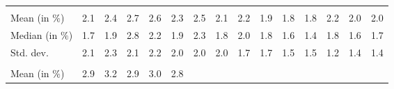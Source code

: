 \begin{tabular}{lllllllllllllll}
  \multicolumn{1}{r}{} &
  \multicolumn{1}{r}{} &
  \multicolumn{1}{r}{} &
  \multicolumn{1}{r}{} &
  \multicolumn{1}{r}{} &
  \multicolumn{1}{r}{} &
  \multicolumn{1}{r}{} &
  \multicolumn{1}{r}{} &
  \multicolumn{1}{r}{} &
  \multicolumn{1}{r}{} \\
\multicolumn{1}{l}{\hspace{2em}Mean (in $\%$)} &
  \multicolumn{1}{|r}{2.1} &
  \multicolumn{1}{r}{2.4} &
  \multicolumn{1}{r}{2.7} &
  \multicolumn{1}{r}{2.6} &
  \multicolumn{1}{r}{2.3} &
  \multicolumn{1}{r}{2.5} &
  \multicolumn{1}{r}{2.1} &
  \multicolumn{1}{r}{2.2} &
  \multicolumn{1}{r}{1.9} &
  \multicolumn{1}{r}{1.8} &
  \multicolumn{1}{r}{1.8} &
  \multicolumn{1}{r}{2.2} &
  \multicolumn{1}{r}{2.0} &
  \multicolumn{1}{r}{2.0} \\
\multicolumn{1}{l}{\hspace{2em}Median (in $\%$)} &
  \multicolumn{1}{|r}{1.7} &
  \multicolumn{1}{r}{1.9} &
  \multicolumn{1}{r}{2.8} &
  \multicolumn{1}{r}{2.2} &
  \multicolumn{1}{r}{1.9} &
  \multicolumn{1}{r}{2.3} &
  \multicolumn{1}{r}{1.8} &
  \multicolumn{1}{r}{2.0} &
  \multicolumn{1}{r}{1.8} &
  \multicolumn{1}{r}{1.6} &
  \multicolumn{1}{r}{1.4} &
  \multicolumn{1}{r}{1.8} &
  \multicolumn{1}{r}{1.6} &
  \multicolumn{1}{r}{1.7} \\
\multicolumn{1}{l}{\hspace{2em}Std. dev.} &
  \multicolumn{1}{|r}{2.1} &
  \multicolumn{1}{r}{2.3} &
  \multicolumn{1}{r}{2.1} &
  \multicolumn{1}{r}{2.2} &
  \multicolumn{1}{r}{2.0} &
  \multicolumn{1}{r}{2.0} &
  \multicolumn{1}{r}{2.0} &
  \multicolumn{1}{r}{1.7} &
  \multicolumn{1}{r}{1.7} &
  \multicolumn{1}{r}{1.5} &
  \multicolumn{1}{r}{1.5} &
  \multicolumn{1}{r}{1.2} &
  \multicolumn{1}{r}{1.4} &
  \multicolumn{1}{r}{1.4} \\
\multicolumn{1}{l}{\hspace{1em}{\textit{Additive term} ($\widehat{t}/\widetilde{p}$)}} &
  \multicolumn{1}{|r}{} &
  \multicolumn{1}{r}{} &
  \multicolumn{1}{r}{} &
  \multicolumn{1}{r}{} &
  \multicolumn{1}{r}{} &
  \multicolumn{1}{r}{} &
  \multicolumn{1}{r}{} &
  \multicolumn{1}{r}{} &
  \multicolumn{1}{r}{} &
  \multicolumn{1}{r}{} &
  \multicolumn{1}{r}{} &
  \multicolumn{1}{r}{} &
  \multicolumn{1}{r}{} &
  \multicolumn{1}{r}{} \\
\multicolumn{1}{l}{\hspace{2em}Mean (in $\%$)} &
  \multicolumn{1}{|r}{2.9} &
  \multicolumn{1}{r}{3.2} &
  \multicolumn{1}{r}{2.9} &
  \multicolumn{1}{r}{3.0} &
  \multicolumn{1}{r}{2.8} &

\end{tabular}
